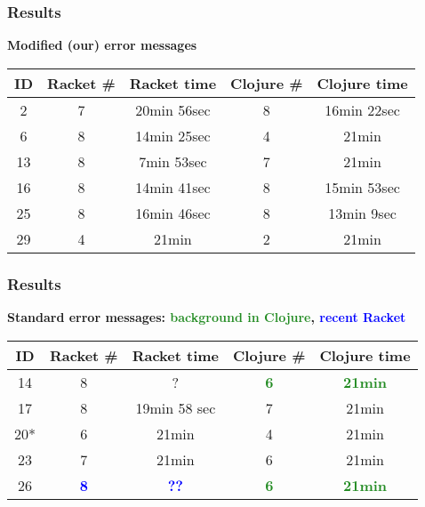 \documentclass{beamer}
\newcommand{\comment}[1]{{\bf \tt  {#1}}}
\newcommand{\emcomment}[1]{\textcolor{ForestGreen}{\comment{Elena: {#1}}}}
\newcommand{\R}[1]{\textcolor{blue}{\bf {#1}}}
\newcommand{\Cl}[1]{\textcolor{ForestGreen}{\bf {#1}}}
\begin{document}
\begin{frame}
\frametitle{Results}
{\bf Modified (our) error messages}
\vspace{0.1in}

\begin{tabular}{c | c| c| c | c }
\hline
{\bf ID} & {\bf Racket  \#} & {\bf Racket time} & {\bf Clojure  \#} & {\bf Clojure time} \\
\hline 
2 & 7  & 20min 56sec & 8 & 16min 22sec  \\
6 &  8  & 14min 25sec &  4  &  21min \\
13 &  8 & 7min 53sec &  7 &  21min \\
16 &  8  & 14min 41sec &  8  &  15min 53sec \\
25 &  8  & 16min 46sec &  8  &  13min 9sec \\
29 &  4  & 21min &  2  &  21min \\
\hline
\end{tabular}
\end{frame}

\begin{frame}
\frametitle{Results}
{\bf Standard error messages: \Cl{background in Clojure}, \R{recent Racket}}
\vspace{0.1in}

\begin{tabular}{c | c| c| c | c }
\hline
{\bf ID} & {\bf Racket  \#} & {\bf Racket time} & {\bf Clojure \#} & {\bf Clojure time} \\
\hline 
14 &  8 & ? &  \Cl{6}  &  \Cl{21min} \\
17 &  8 & 19min 58 sec &  7 &  21min \\
20* &  6 & 21min &  4 &  21min \\
23 &  7 & 21min &  6  &  21min \\
26 &  \R{8} & \R{??} &  \Cl{6} &  \Cl{21min} \\
\hline
\end{tabular}


\end{frame}
\end{document}
